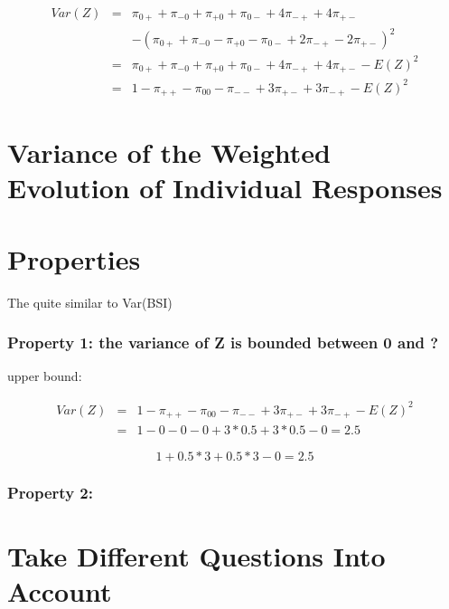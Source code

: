 \documentclass[12pt,a4paper,oneside]{book}
\begin{document}

\begin{eqnarray}
Var(Z) &=& \pi_{0+} + \pi_{-0} + \pi_{+0} + \pi_{0-} +4\pi_{-+} +4\pi_{+-} \nonumber \nonumber \\ 
&&    - (\pi_{0+} + \pi_{-0} - \pi_{+0} - \pi_{0-} +2\pi_{-+} -2\pi_{+-})^2  \\
&=& \pi_{0+} + \pi_{-0} + \pi_{+0} + \pi_{0-} +4\pi_{-+} +4\pi_{+-} - E(Z)^2  \\
&=& 1 - \pi_{++} - \pi_{00} - \pi_{--} + 3\pi_{+-} + 3\pi_{-+} - E(Z)^2
\end{eqnarray}




\section{Variance of the Weighted Evolution of Individual Responses}


\section{Properties}

The 
quite similar to Var(BSI)


\subsubsection{Property 1: the variance of Z is bounded between 0 and ?}
upper bound:

\begin{eqnarray}
Var(Z) &=& 1 - \pi_{++} - \pi_{00} - \pi_{--} + 3\pi_{+-} + 3\pi_{-+} - E(Z)^2 \nonumber \\
	&=& 1 - 0 - 0 - 0 + 3*0.5 + 3*0.5 - 0 = 2.5 \nonumber
\end{eqnarray}


\begin{equation}
	1+ 0.5*3 + 0.5*3 - 0 = 2.5
\end{equation}

\subsubsection{Property 2: }

\section{Take Different Questions Into Account}
\end{document}
